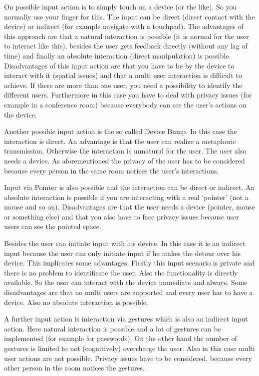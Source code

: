 \documentclass{acm_proc_article-sp}
\begin{document}
On possible input action is to simply touch on a device (or the like).
So you normally use your finger for this.
The input can be direct (direct contact with the device) or indirect (for example navigate with a touchpad).
The advantages of this approach are that a natural interaction is possible (it is normal for the user to interact like this), besides the user gets feedback directly (without any lag of time) and finally an absolute interaction (direct manipulation) is possible.
Disadvantages of this input action are that you have to be by the device to interact with it (spatial issues) and that a multi user interaction is difficult to achieve.
If there are more than one user, you need a possibility to identify the different users.
Furthermore in this case you have to deal with privacy issues (for example in a conference room) because everybody can see the user’s actions on the device.

Another possible input action is the so called Device Bump.
In this case the interaction is direct.
An advantage is that the user can realize a metaphoric transmission.
Otherwise the interaction is unnatural for the user.
The user also needs a device.
As aforementioned the privacy of the user has to be considered because every person in the same room notices the user’s interactions. 

Input via Pointer is also possible and the interaction can be direct or indirect.
An absolute interaction is possible if you are interacting with a real ‘pointer’ (not a mouse and so on).
Disadvantages are that the user needs a device (pointer, mouse or something else) and that you also have to face privacy issues because user users can see the pointed space.

Besides the user can initiate input with his device.
In this case it is an indirect input because the user can only initiate input if he makes the detour over his device. This implicates some advantages.
Firstly this input scenario is private and there is no problem to identificate the user.
Also the functionality is directly available.
So the user can interact with the device immediate and always.
Some disadvantages are that no multi users are supported and every user has to have a device.
Also no absolute interaction is possible.

A further input action is interaction via gestures which is also an indirect input action.
Here natural interaction is possible and a lot of gestures can be implemented (for example for passwords).
On the other hand the number of gestures is limited to not (cognitively) overcharge the user.
Also in this case multi user actions are not possible.
Privacy issues have to be considered, because every other person in the room notices the gestures.
\end{document}
